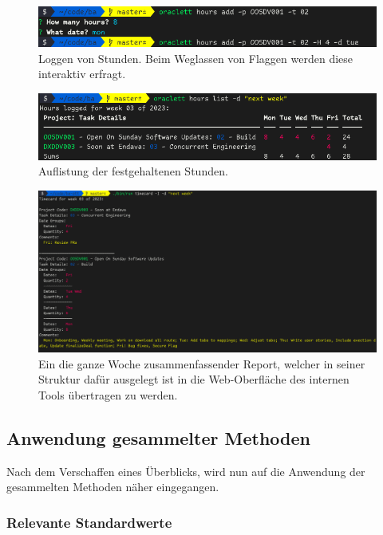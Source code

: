 \documentclass[oneside,bibliography=totocnumbered,BCOR=5mm]{scrbook}
\begin{document}
\begin{figure}
  \centering
  \includegraphics[scale=0.5]{hours-add.png}
  \caption{Loggen von Stunden. Beim Weglassen von Flaggen werden diese interaktiv erfragt.}
  \label{fig:hours-add}
\end{figure}

\begin{figure}
  \centering
  \includegraphics[scale=0.5]{hours-list-real.png}
  \caption{Auflistung der festgehaltenen Stunden.}
  \label{fig:hours-list}
\end{figure}

\begin{figure}
  \centering
  \includegraphics[scale=0.5]{timecard-real.png}
  \caption{Ein die ganze Woche zusammenfassender Report, welcher in seiner Struktur dafür ausgelegt ist in die Web-Oberfläche des internen Tools übertragen zu werden.}
  \label{fig:timecard}
\end{figure}

\subsection{Anwendung gesammelter Methoden}

Nach dem Verschaffen eines Überblicks, wird nun auf die Anwendung der
gesammelten Methoden näher eingegangen.

\subsubsection{Relevante Standardwerte}
\end{document}
